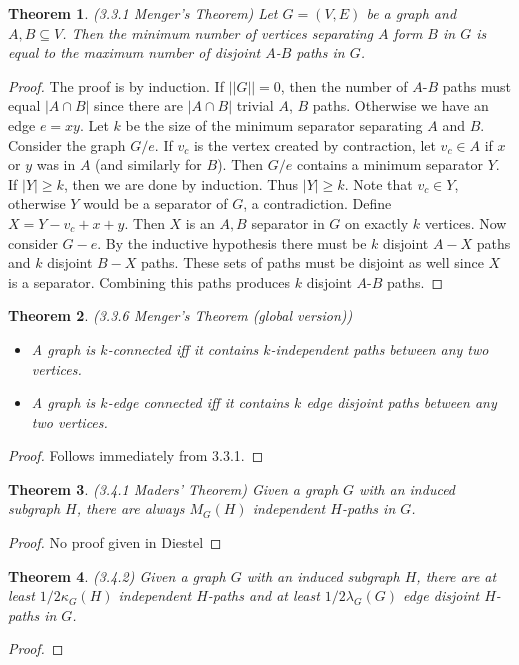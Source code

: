 \documentclass[12pt]{article}
\newtheorem{theorem}{Theorem}
\begin{document}
\begin{theorem} (3.3.1 Menger's Theorem) Let $G=(V,E)$ be a graph and
  $A,B \subseteq V$. Then the minimum number of vertices separating
  $A$ form $B$ in $G$ is equal to the maximum number of disjoint
  $A$-$B$ paths in $G$.
\end{theorem}
\begin{proof} The proof is by induction. If $||G|| = 0$, then the
  number of $A$-$B$ paths must equal $|A \cap B|$ since there are
  $|A \cap B|$ trivial $A$, $B$ paths. Otherwise we have an edge
  $e = xy$. Let $k$ be the size of the minimum separator separating
  $A$ and $B$. Consider the graph $G / e$. If $v_c$ is the vertex
  created by contraction, let $v_c \in A$ if $x$ or $y$ was in $A$
  (and similarly for $B$). Then $G/e$ contains a minimum separator
  $Y$. If $|Y| \geq k$, then we are done by induction. Thus
  $|Y| \geq k$. Note that $v_c \in Y$, otherwise $Y$ would be a
  separator of $G$, a contradiction. Define $X = Y - v_c + x +
  y$. Then $X$ is an $A,B$ separator in $G$ on exactly $k$
  vertices. Now consider $G-e$. By the inductive hypothesis there must
  be $k$ disjoint $A-X$ paths and $k$ disjoint $B-X$ paths. These sets
  of paths must be disjoint as well since $X$ is a
  separator. Combining this paths produces $k$ disjoint $A$-$B$ paths.
\end{proof}

\begin{theorem} (3.3.6 Menger's Theorem (global version))
  \begin{itemize}
  \item A graph is $k$-connected iff it contains $k$-independent paths
    between any two vertices.
  \item A graph is $k$-edge connected iff it contains $k$ edge
    disjoint paths between any two vertices.
  \end{itemize}
\end{theorem}
\begin{proof} Follows immediately from 3.3.1.
\end{proof}

\begin{theorem} (3.4.1 Maders' Theorem) Given a graph $G$ with an
  induced subgraph $H$, there are always $M_G(H)$ independent
  $H$-paths in $G$.
\end{theorem}
\begin{proof} No proof given in Diestel
\end{proof}

\begin{theorem} (3.4.2) Given a graph $G$ with an induced subgraph
  $H$, there are at least $1/2 \kappa_G (H)$ independent $H$-paths and
  at least $1/2 \lambda_G(G)$ edge disjoint $H$-paths in $G$.
\end{theorem}
\begin{proof}
\end{proof}
\end{document}
